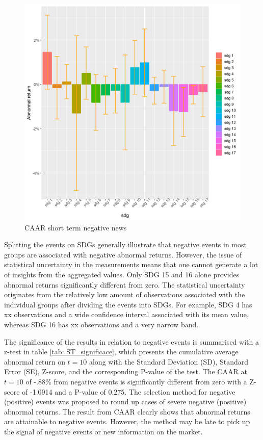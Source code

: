 \begin{figure} [H]
    \centering
    \includegraphics[scale=0.6]{Projekt/1.Figures analysis/ST_negative_sdg_bar.png}
    \caption{CAAR short term negative news}
    \label{fig:ST_neg_bar}
\end{figure}

Splitting the events on SDGs generally illustrate that negative events in most groups are associated with negative abnormal returns. However, the issue of statistical uncertainty in the measurements means that one cannot generate a lot of insights from the aggregated values. Only SDG 15 and 16 alone provides abnormal returns significantly different from zero. The statistical uncertainty originates from the relatively low amount of observations associated with the individual groups after dividing the events into SDGs. For example, SDG 4 has xx observations and a wide confidence interval associated with its mean value, whereas SDG 16 has xx observations and a very narrow band. 


The significance of the results in relation to negative events is summarised with a z-test in table \ref{tab: ST_significace}, which presents the cumulative average abnormal return on $t = 10$ along with the Standard Deviation (SD), Standard Error (SE), Z-score, and the corresponding P-value of the test. The CAAR at $t = 10$ of -.88\% from negative events is significantly different from zero with a Z-score of -1.0914 and a P-value of 0.275. The selection method for negative (positive) events was proposed to round up cases of severe negative (positive) abnormal returns. The result from CAAR clearly shows that abnormal returns are attainable to negative events. However, the method may be late to pick up the signal of negative events or new information on the market. 


